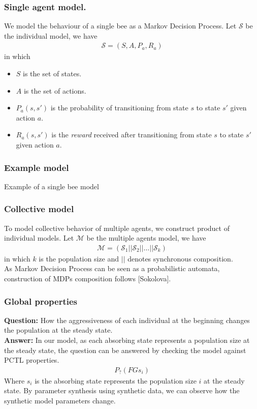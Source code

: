 \documentclass{beamer}
\begin{document}
\begin{frame}
  \frametitle{Single agent model.}
  We model the behaviour of a single bee as a Markov Decision Process. Let
  $\mathcal{S}$ be the individual model, we have
  \begin{align*}
    \mathcal{S} = (S, A, P_a, R_a)
  \end{align*}
  in which
  \begin{itemize}
  \item $S$ is the set of states.
  \item $A$ is the set of actions.
  \item $P_a(s,s')$ is the probability of transitioning from state $s$ to state
    $s'$ given action $a$.
  \item $R_a(s,s')$ is the \textit{reward} received after transitioning from
    state $s$ to state $s'$ given action $a$.
  \end{itemize}
\end{frame}

\begin{frame}
  \frametitle{Example model}
  Example of a single bee model
\end{frame}

\begin{frame}
  \frametitle{Collective model}
  To model collective behavior of multiple agents, we construct product of
  individual models. Let $\mathcal{M}$ be the multiple agents model, we have
  \begin{align*}
    \mathcal{M} = (\mathcal{S}_1||\mathcal{S}_2||\ldots||\mathcal{S}_k) 
  \end{align*}
  in which $k$ is the population size and $||$ denotes synchronous composition.\\
  As Markov Decision Process can be seen as a probabilistic automata,
  construction of MDPs composition follows [Sokolova].
\end{frame}

\begin{frame}
  \frametitle{Global properties}
  \textbf{Question:} How the aggressiveness of each individual at the beginning
  changes the population at the steady state.\\
  \textbf{Answer:} In our model, as each absorbing state represents a population
  size at the steady state, the question can be answered by checking the model
  against PCTL properties.
  \begin{align*}
    P_{?} (FG s_i)
  \end{align*}
  Where $s_i$ is the absorbing state represents the population size $i$ at the
  steady state. By parameter synthesis using synthetic data, we can observe how
  the synthetic model parameters change.
\end{frame}
\end{document}
